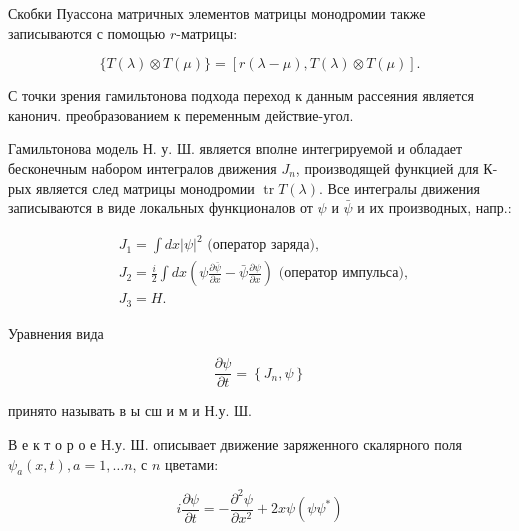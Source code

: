 \documentclass[10pt]{article}
\begin{document}
Скобки Пуассона матричных элементов матрицы монодромии также записываются с помощью $r$-матрицы:



\[

\{T(\lambda) \otimes T(\mu)\}=[r(\lambda-\mu), T(\lambda) \otimes T(\mu)] .

\]



С точки зрения гамильтонова подхода переход к данным рассеяния является канонич. преобразованием к переменным действие-угол.



Гамильтонова модель Н. у. Ш. является вполне интегрируемой и обладает бесконечным набором интегралов движения $J_{n}$, производящей функцией для К-рых является след матрицы монодромии $\operatorname{tr} T(\lambda)$. Все интегралы движения записываются в виде локальных функционалов от $\psi$ и $\bar{\psi}$ и их производных, напр.:



\[

\begin{aligned}

& J_{1}=\int d x|\psi|^{2} \text { (оператор заряда), } \\

& J_{2}=\frac{i}{2} \int d x\left(\psi \frac{\partial \bar{\psi}}{\partial x}-\bar{\psi} \frac{\partial \psi}{\partial x}\right) \text { (оператор импульса), } \\

& J_{3}=H .

\end{aligned}

\]



Уравнения вида



\[

\frac{\partial \psi}{\partial t}=\left\{J_{n}, \psi\right\}

\]



принято называть в ы сш и м и Н.у. Ш.



В е к т о р о е Н.у. Ш. описывает движение заряженного скалярного поля $\psi_{a}(x, t), a=1, \ldots n$, с $n$ цветами:



\[

i \frac{\partial \psi}{\partial t}=-\frac{\partial^{2} \psi}{\partial x^{2}}+2 x \psi\left(\psi \psi^{*}\right)

\]
\end{document}
